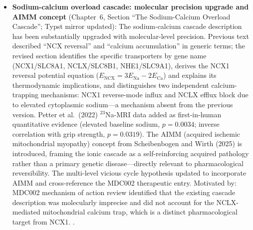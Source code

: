 \begin{itemize}
  \item \textbf{Sodium-calcium overload cascade: molecular precision upgrade and AIMM concept}
    (Chapter~6, Section ``The Sodium-Calcium Overload Cascade''; Typst mirror updated):
    The sodium-calcium cascade description has been substantially upgraded with
    molecular-level precision. Previous text described ``NCX reversal'' and
    ``calcium accumulation'' in generic terms; the revised section identifies the
    specific transporters by gene name (NCX1/SLC8A1, NCLX/SLC8B1, NHE1/SLC9A1),
    derives the NCX1 reversal potential equation ($E_\text{NCX} = 3E_\text{Na} - 2E_\text{Ca}$)
    and explains its thermodynamic implications, and distinguishes two independent
    calcium-trapping mechanisms: NCX1 reverse-mode influx and NCLX efflux block
    due to elevated cytoplasmic sodium---a mechanism absent from the previous version.
    Petter et al.~(2022) $^{23}$Na-MRI data added as first-in-human quantitative
    evidence (elevated baseline sodium, $p=0.0034$; inverse correlation with
    grip strength, $p=0.0319$). The AIMM (acquired ischemic mitochondrial myopathy)
    concept from Scheibenbogen and Wirth (2025) is introduced, framing the ionic
    cascade as a self-reinforcing acquired pathology rather than a primary genetic
    disease---directly relevant to pharmacological reversibility. The multi-level
    vicious cycle hypothesis updated to incorporate AIMM and cross-reference
    the MDC002 therapeutic entry.
    Motivated by: MDC002 mechanism of action review identified that the existing
    cascade description was molecularly imprecise and did not account for the
    NCLX-mediated mitochondrial calcium trap, which is a distinct pharmacological
    target from NCX1.
    \cite{WirthScheibenbogen2020,WirthScheibenbogen2021muscle,Petter2022sodium,Scheibenbogen2025muscle}.


\end{itemize}

